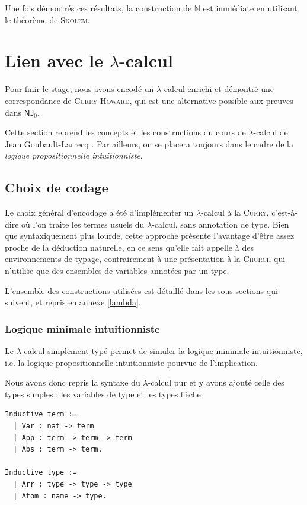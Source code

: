 \documentclass[a4paper]{article}
\newcommand{\N}{\ensuremath{\mathbb{N}}}
\newcommand{\NJ}{\mathsf{NJ}}
\theoremstyle{remark}
\theoremstyle{remark}
\theoremstyle{remark}
\theoremstyle{definition}
\theoremstyle{definition}
\theoremstyle{definition}
\begin{document}
Une fois démontrés ces résultats, la construction de $\N$ est immédiate en utilisant le théorème de \textsc{Skolem}.

\newpage


\section{Lien avec le $\lambda$-calcul}

Pour finir le stage, nous avons encodé un $\lambda$-calcul enrichi et démontré une correspondance de \textsc{Curry-Howard}, qui est une alternative possible aux preuves dans $\NJ_0$.

Cette section reprend les concepts et les constructions du cours de $\lambda$-calcul de Jean Goubault-Larrecq \cite{polylam}. Par ailleurs, on se placera toujours dans le cadre de la \emph{logique propositionnelle intuitionniste}.

\subsection{Choix de codage}

Le choix général d'encodage a été d'implémenter un $\lambda$-calcul à la \textsc{Curry}, c'est-à-dire où l'on traite les termes usuels du $\lambda$-calcul, sans annotation de type. Bien que syntaxiquement plus lourde, cette approche présente l'avantage d'être assez proche de la déduction naturelle, en ce sens qu'elle fait appelle à des environnements de typage, contrairement à une présentation à la \textsc{Church} qui n'utilise que des ensembles de variables annotées par un type.

L'ensemble des constructions utilisées est détaillé dans les sous-sections qui suivent, et repris en annexe \ref{lambda}.

\subsubsection{Logique minimale intuitionniste}

Le $\lambda$-calcul simplement typé permet de simuler la logique minimale intuitionniste, i.e. la logique propositionnelle intuitionniste pourvue de l'implication.

Nous avons donc repris la syntaxe du $\lambda$-calcul pur et y avons ajouté celle des types simples : les variables de type et les types flèche.
\begin{verbatim}
Inductive term :=
  | Var : nat -> term
  | App : term -> term -> term
  | Abs : term -> term.
  
Inductive type :=
  | Arr : type -> type -> type
  | Atom : name -> type.
\end{verbatim}
\end{document}

